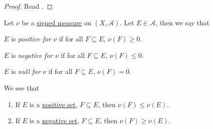 \begin{proof}
	Read \cite{folland1999real}.
\end{proof}
\begin{definition*}
	Let \(\nu\) be a \hyperref[def:signed-measure]{signed measure} on \((X, \mathcal{A})\). Let \(E \in \mathcal{A}\), then we say that
	\begin{definition}\label{def:positive-set-for-a-signed-measure}
		\(E\) is \emph{positive for \(\nu\)} if for all \(F \subseteq E\), \(\nu(F) \geq 0\).
	\end{definition}
	\begin{definition}\label{def:negative-set-for-a-signed-measure}
		\(E\) is \emph{negative for \(\nu\)} if for all \(F \subseteq E\), \(\nu(F) \leq 0\).
	\end{definition}
	\begin{definition}\label{def:null-set-for-a-signed-measure}
		\(E\) is \emph{null for \(\nu\)} if for all \(F \subseteq E\), \(\nu(F) = 0\).
	\end{definition}
\end{definition*}

\begin{note}
	We see that
	\begin{enumerate}
		\item If \(E\) is a \hyperref[def:positive-set-for-a-signed-measure]{positive set}, \(F \subseteq E\), then \(\nu(F) \leq \nu(E)\).
		\item If \(E\) is a \hyperref[def:negative-set-for-a-signed-measure]{negative set}, \(F \subseteq E\), then \(\nu(F) \geq \nu(E)\).
	\end{enumerate}
\end{note}

